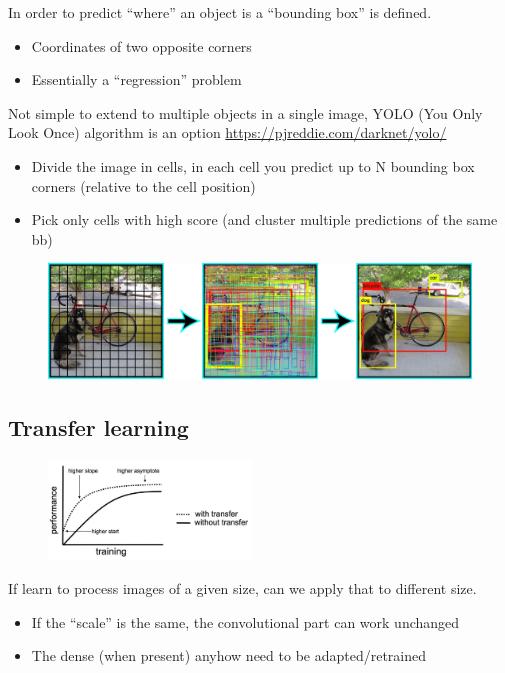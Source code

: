 In order to predict “where” an object is a “bounding box” is defined.
\begin{itemize}
	\item Coordinates of two opposite corners
	\item Essentially a “regression” problem
\end{itemize}

Not simple to extend to multiple objects in a single image, YOLO (You Only Look Once) algorithm is an option \url{https://pjreddie.com/darknet/yolo/}\\
\begin{itemize}
	\item Divide the image in cells, in each cell you predict up to N bounding box corners (relative to the cell position) 
	\item Pick only cells with high score (and cluster multiple predictions of the same bb)
\end{itemize}

\begin{figure}[ht]
	\centering
	\includegraphics[width=0.9\linewidth]{figure_ml/bb.png}
\end{figure}
\FloatBarrier


\subsection{Transfer learning}

\begin{figure}
	\includegraphics[width=0.48\textwidth]{figure_ml/tl.png}
\end{figure}

If learn to process images of a given size, can we apply that to different size.
\begin{itemize}
	\item If the “scale” is the same, the convolutional part can work unchanged
	\item The dense (when present) anyhow need to be adapted/retrained
\end{itemize}

